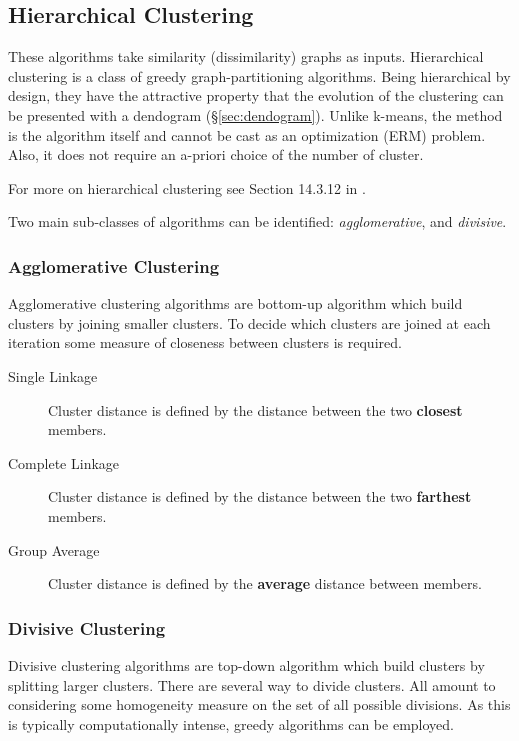 \subsection{Hierarchical Clustering}
\label{sec:hierarchical}



These algorithms take similarity (dissimilarity) graphs as inputs.
Hierarchical clustering is a class of greedy graph-partitioning algorithms. 
Being hierarchical by design, they have the attractive property that the evolution of the clustering can be presented with a dendogram (\S\ref{sec:dendogram}).  
Unlike k-means, the method is the algorithm itself and cannot be cast as an optimization (ERM) problem.
Also, it does not require an a-priori choice of the number of cluster.

For more on hierarchical clustering see Section 14.3.12 in \cite{hastie_elements_2003}.

Two main sub-classes of algorithms can be identified: \emph{agglomerative}, and \emph{divisive}.
\subsubsection{Agglomerative Clustering}
Agglomerative clustering algorithms are bottom-up algorithm which build clusters by joining smaller clusters. 
To decide which clusters are joined at each iteration some measure of closeness between clusters is required. 
\begin{description}
\item[Single Linkage] Cluster distance is defined by the distance between the two \textbf{closest} members.
\item[Complete Linkage] Cluster distance is defined by the distance between the two \textbf{farthest} members.
\item[Group Average] Cluster distance is defined by the \textbf{average} distance between members.
\end{description}


\subsubsection{Divisive Clustering}
Divisive clustering algorithms are top-down algorithm which build clusters by splitting larger clusters. 
There are several way to divide clusters. All amount to considering some homogeneity measure on the set of all possible divisions. As this is typically computationally intense, greedy algorithms can be employed.












